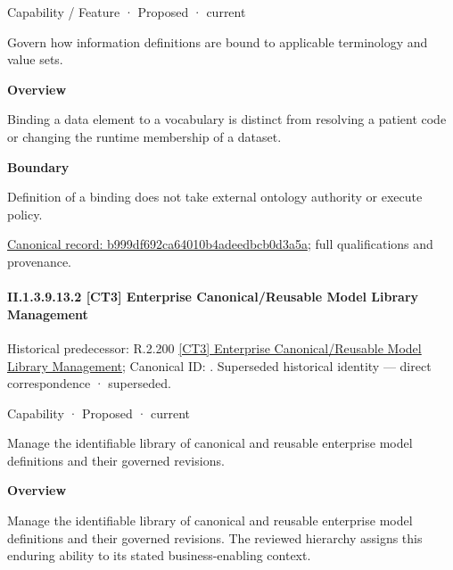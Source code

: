\label{element:b999df692ca64010b4adeedbcb0d3a5a}
{\small Capability / Feature · Proposed · current}\par

Govern how information definitions are bound to applicable terminology and value sets.



\textbf{Overview}



Binding a data element to a vocabulary is distinct from resolving a patient code or changing the runtime membership of a dataset.



\textbf{Boundary}



Definition of a binding does not take external ontology authority or execute policy.


{\footnotesize \href{../../../../continuum/strategy/capability/feature/b999df692ca64010b4adeedbcb0d3a5a.md}{Canonical record: b999df692ca64010b4adeedbcb0d3a5a}; full qualifications and provenance.}\par
\paragraph*{II.1.3.9.13.2 [CT3] Enterprise Canonical/Reusable Model Library Management}
\label{navigation:II.1.3.9.13.2}

{\small Historical predecessor: R.2.200 \hyperref[element:f5eccd4f65df49bba98104e5abfa5e19]{[CT3] Enterprise Canonical/Reusable Model Library Management}; Canonical ID: \texttt{}. Superseded historical identity — direct correspondence · superseded.}\par
\label{element:76943b4b68644c4dac1368fce8bb20d9}
{\small Capability · Proposed · current}\par

Manage the identifiable library of canonical and reusable enterprise model definitions and their governed revisions.



\textbf{Overview}



Manage the identifiable library of canonical and reusable enterprise model definitions and their governed revisions. The reviewed hierarchy assigns this enduring ability to its stated business-enabling context.



